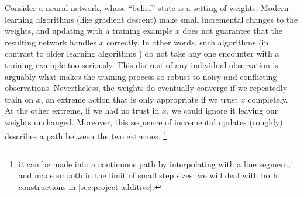 Consider a neural network, whose ``belief'' state is a setting of weights.
Modern learning algorithms (like gradient descent) make small incremental changes to the weights, and updating with a training example $x$ does not guarantee that the resulting network handles $x$ correctly. 
In other words, such algorithms 
(in contrast to older learning algorithms \parencite{conjunctions}) 
do not take any one encounter with a training example too seriously.
This distrust of any individual observation is arguably what makes the training process so robust to noisy and conflicting observations.
Nevertheless, the weights do eventually converge if we repeatedly train on $x$, 
an extreme action that is only appropriate if we trust $x$ completely.
At the other extreme, if we had no trust in $x$, we could ignore it leaving our weights unchanged. 
Moreover, this sequence of incremental updates (roughly) describes a path between the two extremes.%
	\footnote{it can be made into a continuous path by interpolating with a line segment, and made smooth in the limit of small step sizes; we will deal with both constructions in \cref{sec:project-additive}.}
